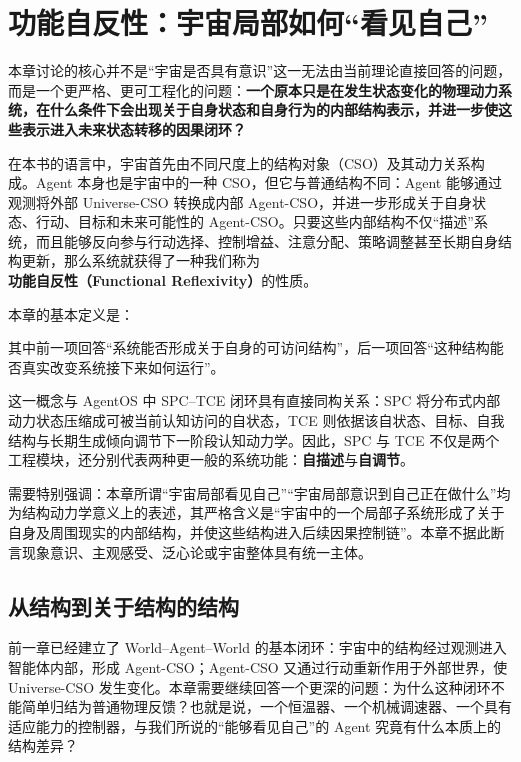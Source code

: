 \chapter{功能自反性：宇宙局部如何“看见自己”}

\begin{chapterlead}
本章讨论的核心并不是“宇宙是否具有意识”这一无法由当前理论直接回答的问题，而是一个更严格、更可工程化的问题：\textbf{一个原本只是在发生状态变化的物理动力系统，在什么条件下会出现关于自身状态和自身行为的内部结构表示，并进一步使这些表示进入未来状态转移的因果闭环？}

在本书的语言中，宇宙首先由不同尺度上的结构对象（CSO）及其动力关系构成。Agent 本身也是宇宙中的一种 CSO，但它与普通结构不同：Agent 能够通过观测将外部 Universe-CSO 转换成内部 Agent-CSO，并进一步形成关于自身状态、行动、目标和未来可能性的 Agent-CSO。只要这些内部结构不仅“描述”系统，而且能够反向参与行动选择、控制增益、注意分配、策略调整甚至长期自身结构更新，那么系统就获得了一种我们称为\textbf{功能自反性（Functional Reflexivity）}的性质。

本章的基本定义是：
\begin{statementbox}
\centering
{}
\end{statementbox}

其中前一项回答“系统能否形成关于自身的可访问结构”，后一项回答“这种结构能否真实改变系统接下来如何运行”。

这一概念与 AgentOS 中 SPC--TCE 闭环具有直接同构关系：SPC 将分布式内部动力状态压缩成可被当前认知访问的自状态，TCE 则依据该自状态、目标、自我结构与长期生成倾向调节下一阶段认知动力学。因此，SPC 与 TCE 不仅是两个工程模块，还分别代表两种更一般的系统功能：\textbf{自描述}与\textbf{自调节}。

需要特别强调：本章所谓“宇宙局部看见自己”“宇宙局部意识到自己正在做什么”均为结构动力学意义上的表述，其严格含义是“宇宙中的一个局部子系统形成了关于自身及周围现实的内部结构，并使这些结构进入后续因果控制链”。本章不据此断言现象意识、主观感受、泛心论或宇宙整体具有统一主体。
\end{chapterlead}


\section{从结构到关于结构的结构}

前一章已经建立了 World--Agent--World 的基本闭环：宇宙中的结构经过观测进入智能体内部，形成 Agent-CSO；Agent-CSO 又通过行动重新作用于外部世界，使 Universe-CSO 发生变化。本章需要继续回答一个更深的问题：为什么这种闭环不能简单归结为普通物理反馈？也就是说，一个恒温器、一个机械调速器、一个具有适应能力的控制器，与我们所说的“能够看见自己”的 Agent 究竟有什么本质上的结构差异？

